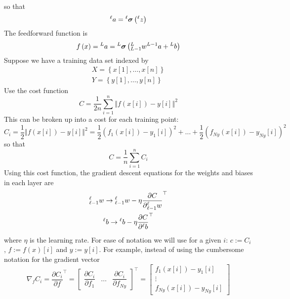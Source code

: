 \documentclass[11pt]{report} %
\begin{document}
so that
\begin{equation}
\mathstrut^{\ell}a=\mathstrut^{\ell}\boldsymbol{\sigma}\left(\mathstrut^{\ell}z\right)
\end{equation}
The feedforward function is
\begin{equation}
f\left(x\right)=\mathstrut^{L}a=\mathstrut^{L}\boldsymbol{\sigma}\left(\mathstrut_{L-1}^{L}w\mathstrut^{L-1}a+\mathstrut^{L}b\right)
\end{equation}
Suppose we have a training data set indexed by
\begin{gather}
X=\left\{ x\left[1\right],\dots,x\left[n\right]\right\} \\
Y=\left\{ y\left[1\right],\dots,y\left[n\right]\right\} 
\end{gather}
Use the cost function
\begin{equation}
C=\dfrac{1}{2n}\sum_{i=1}^{n}\left\Vert f\left(x\left[i\right]\right)-y\left[i\right]\right\Vert ^{2}
\end{equation}
This can be broken up into a cost for each training point:
\begin{equation}
C_{i}=\dfrac{1}{2}\left\Vert f\left(x\left[i\right]\right)-y\left[i\right]\right\Vert ^{2}=\dfrac{1}{2}\left(f_{1}\left(x\left[i\right]\right)-y_{1}\left[i\right]\right)^{2}+\dots+\dfrac{1}{2}\left(f_{Ny}\left(x\left[i\right]\right)-y_{Ny}\left[i\right]\right)^{2}
\end{equation}
so that
\begin{equation}
C=\dfrac{1}{n}\sum_{i=1}^{n}C_{i}
\end{equation}
Using this cost function, the gradient descent equations for the weights and biases in each layer are
\begin{gather}
\mathstrut_{\ell-1}^{\ell}w\rightarrow\mathstrut_{\ell-1}^{\ell}w-\eta\dfrac{\partial C}{\partial\mathstrut_{\ell-1}^{\ell}w}^{\top} \\
\mathstrut^{\ell}b\rightarrow\mathstrut^{\ell}b-\eta\dfrac{\partial C}{\partial\mathstrut^{\ell}b}^{\top}
\end{gather}
where $\eta$ is the learning rate. For ease of notation we will use for a given $i$: $c := C_{i}$, $f := f\left(x\right)\left[i\right]$ and $y:= y\left[i\right]$. For example, instead of using the cumbersome notation for the gradient vector
\begin{equation}
\nabla_{f}C_{i}=\dfrac{\partial C_{i}}{\partial f}^{\top}=\begin{bmatrix}\dfrac{\partial C_{i}}{\partial f_{1}} & \dots & \dfrac{\partial C_{i}}{\partial f_{Ny}}\end{bmatrix}^{\top}=\begin{bmatrix}f_{1}\left(x\left[i\right]\right)-y_{1}\left[i\right]\\
\vdots\\
f_{Ny}\left(x\left[i\right]\right)-y_{Ny}\left[i\right]
\end{bmatrix}
\end{equation}
\end{document}
